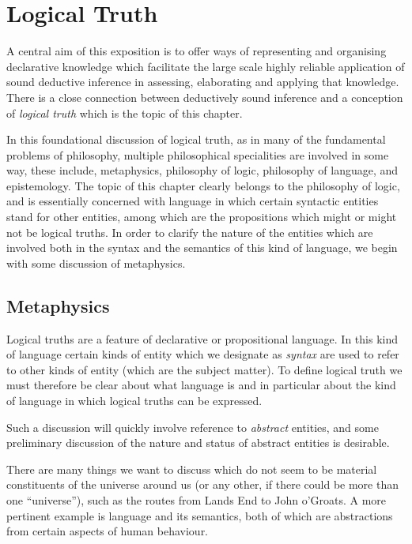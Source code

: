 \documentclass[10pt,titlepage]{book}
\begin{document}
\section{Logical Truth}

A central aim of this exposition is to offer ways of representing and organising declarative knowledge which facilitate the large scale highly reliable application of sound deductive inference in assessing, elaborating and applying that knowledge.
There is a close connection between deductively sound inference and a conception of \emph{logical truth} which is the topic of this chapter.

In this foundational discussion of logical truth, as in many of the fundamental problems of philosophy, multiple philosophical specialities are involved in some way, these include, metaphysics, philosophy of logic, philosophy of language, and epistemology.
The topic of this chapter clearly belongs to the philosophy of logic, and is essentially concerned with language in which certain syntactic entities stand for other entities, among which are the propositions which might or might not be logical truths.
In order to clarify the nature of the entities which are involved both in the syntax and the semantics of this kind of language, we begin with some discussion of metaphysics.

\subsection{Metaphysics}

Logical truths are a feature of declarative or propositional language.
In this kind of language certain kinds of entity which we designate as \emph{syntax} are used to refer to other kinds of entity (which are the subject matter).
To define logical truth we must therefore be clear about what language is and in particular about the kind of language in which logical truths can be expressed.

Such a discussion will quickly involve reference to \emph{abstract} entities, and some preliminary discussion of the nature and status of abstract entities is desirable.

There are many things we want to discuss which do not seem to be material constituents of the universe around us (or any other, if there could be more than one ``universe''), such as the routes from Lands End to John o'Groats.
A more pertinent example is language and its semantics, both of which are abstractions from certain aspects of human behaviour.
\end{document}
